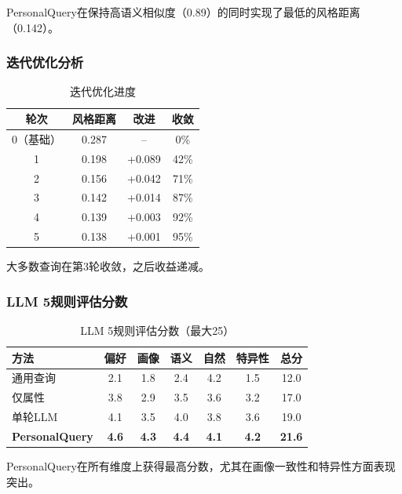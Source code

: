 \documentclass[11pt,a4paper]{article}
\begin{document}
PersonalQuery在保持高语义相似度（0.89）的同时实现了最低的风格距离（0.142）。

\subsubsection{迭代优化分析}

\begin{table}[h]
\centering
\begin{tabular}{cccc}
\toprule
\textbf{轮次} & \textbf{风格距离} & \textbf{改进} & \textbf{收敛} \\
\midrule
0（基础） & 0.287 & -- & 0\% \\
1 & 0.198 & +0.089 & 42\% \\
2 & 0.156 & +0.042 & 71\% \\
3 & 0.142 & +0.014 & 87\% \\
4 & 0.139 & +0.003 & 92\% \\
5 & 0.138 & +0.001 & 95\% \\
\bottomrule
\end{tabular}
\caption{迭代优化进度}
\label{tab:refinement}
\end{table}

大多数查询在第3轮收敛，之后收益递减。

\subsubsection{LLM 5规则评估分数}

\begin{table}[h]
\centering
\small
\begin{tabular}{lcccccc}
\toprule
\textbf{方法} & \textbf{偏好} & \textbf{画像} & \textbf{语义} & \textbf{自然} & \textbf{特异性} & \textbf{总分} \\
\midrule
通用查询 & 2.1 & 1.8 & 2.4 & 4.2 & 1.5 & 12.0 \\
仅属性 & 3.8 & 2.9 & 3.5 & 3.6 & 3.2 & 17.0 \\
单轮LLM & 4.1 & 3.5 & 4.0 & 3.8 & 3.6 & 19.0 \\
\midrule
\textbf{PersonalQuery} & \textbf{4.6} & \textbf{4.3} & \textbf{4.4} & \textbf{4.1} & \textbf{4.2} & \textbf{21.6} \\
\bottomrule
\end{tabular}
\caption{LLM 5规则评估分数（最大25）}
\label{tab:llm}
\end{table}

PersonalQuery在所有维度上获得最高分数，尤其在画像一致性和特异性方面表现突出。
\end{document}
